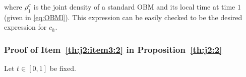 \documentclass[12pt]{article}
\numberwithin{equation}{section}
\theoremstyle{definition}
\theoremstyle{remark}
\newcommand{\RR}{\mathbb{R}}
\newcommand{\vd}{\,\mathrm{d}}
\newcommand{\bfG}[1]{\mathbf{G}_{#1}}
\begin{document}
where 
$\rho_1^\sigma$ is the joint density of a standard OBM and its local time at time $1$ (given in \eqref{eq:OBMl}).
This expression can be easily checked to be 
the desired expression for $c_h$.





\subsubsection{Proof of Item~\ref{th:j2:item3:2} in Proposition~\ref{th:j2:2}}
Let $t\in [0,1]$ be fixed.
\end{document}
